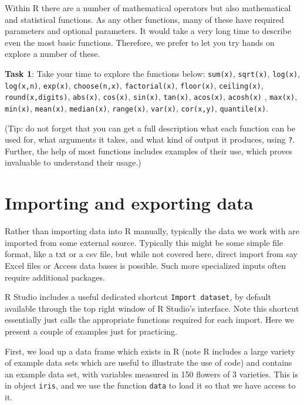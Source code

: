 \documentclass[
]{article}
\begin{document}
Within R there are a number of mathematical operators but also
mathematical and statistical functions. As any other functions, many of
these have required parameters and optional parameters. It would take a
very long time to describe even the most basic functions. Therefore, we
prefer to let you try hands on explore a number of these.

\textbf{Task 1}: Take your time to explore the functions below:
\texttt{sum(x)}, \texttt{sqrt(x)}, \texttt{log(x)}, \texttt{log(x,n)},
\texttt{exp(x)}, \texttt{choose(n,x)}, \texttt{factorial(x)},
\texttt{floor(x)}, \texttt{ceiling(x)}, \texttt{round(x,digits)},
\texttt{abs(x)}, \texttt{cos(x)}, \texttt{sin(x)}, \texttt{tan(x)},
\texttt{acos(x)}, \texttt{acosh(x)} , \texttt{max(x)}, \texttt{min(x)},
\texttt{mean(x)}, \texttt{median(x)}, \texttt{range(x)},
\texttt{var(x)}, \texttt{cor(x,y)}, \texttt{quantile(x)}.

(Tip: do not forget that you can get a full description what each
function can be used for, what arguments it takes, and what kind of
output it produces, using \texttt{?}. Further, the help of most
functions includes examples of their use, which proves invaluable to
understand their usage.)

\hypertarget{importing-and-exporting-data}{%
\section{Importing and exporting
data}\label{importing-and-exporting-data}}

Rather than importing data into R manually, typically the data we work
with are imported from some external source. Typically this might be
some simple file format, like a txt or a csv file, but while not covered
here, direct import from say Excel files or Access data bases is
possible. Such more specialized inputs often require additional
packages.

R Studio includes a useful dedicated shortcut \texttt{Import\ dataset},
by default available through the top right window of R Studio's
interface. Note this shortcut essentially just calls the appropriate
functions required for each import. Here we present a couple of examples
just for practicing.

First, we load up a data frame which exists in R (note R includes a
large variety of example data sets which are useful to illustrate the
use of code) and contains an example data set, with variables measured
in 150 flowers of 3 varieties. This is in object \texttt{iris}, and we
use the function \texttt{data} to load it so that we have access to it.
\end{document}
